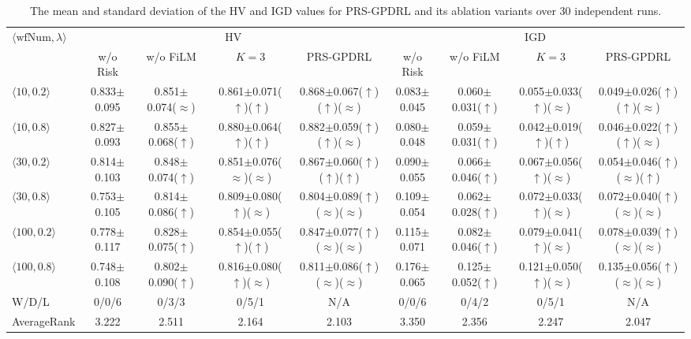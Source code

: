 \documentclass[10pt,journal]{IEEEtran}
\begin{document}
\begin{table}[!t]
\caption{The mean and standard deviation of the HV and IGD values for PRS-GPDRL
and its ablation variants over 30 independent runs.}
\label{Table: combined ablation results}
\centering
\setlength{\tabcolsep}{1.25pt}
\resizebox{\textwidth}{!}%
{\begin{tabular}{@{}lcccccccc@{}}
\toprule
\multirow{2}{*}{$\langle\mathrm{wfNum},\lambda\rangle$}
& \multicolumn{4}{c}{HV} & \multicolumn{4}{c}{IGD} \\
\cmidrule(lr){2-5}\cmidrule(lr){6-9}
& w/o Risk & w/o FiLM & $K=3$ & PRS-GPDRL
& w/o Risk & w/o FiLM & $K=3$ & PRS-GPDRL \\
\midrule
$\langle10,0.2\rangle$
& 0.833$\pm$0.095 & 0.851$\pm$0.074($\approx$) & 0.861$\pm$0.071($\uparrow$)($\uparrow$) & 0.868$\pm$0.067($\uparrow$)($\uparrow$)($\approx$)
& 0.083$\pm$0.045 & 0.060$\pm$0.031($\uparrow$) & 0.055$\pm$0.033($\uparrow$)($\approx$) & 0.049$\pm$0.026($\uparrow$)($\uparrow$)($\approx$) \\
$\langle10,0.8\rangle$
& 0.827$\pm$0.093 & 0.855$\pm$0.068($\uparrow$) & 0.880$\pm$0.064($\uparrow$)($\uparrow$) & 0.882$\pm$0.059($\uparrow$)($\uparrow$)($\approx$)
& 0.080$\pm$0.048 & 0.059$\pm$0.031($\uparrow$) & 0.042$\pm$0.019($\uparrow$)($\uparrow$) & 0.046$\pm$0.022($\uparrow$)($\uparrow$)($\approx$) \\
$\langle30,0.2\rangle$
& 0.814$\pm$0.103 & 0.848$\pm$0.074($\uparrow$) & 0.851$\pm$0.076($\approx$)($\approx$) & 0.867$\pm$0.060($\uparrow$)($\uparrow$)($\uparrow$)
& 0.090$\pm$0.055 & 0.066$\pm$0.046($\uparrow$) & 0.067$\pm$0.056($\uparrow$)($\approx$) & 0.054$\pm$0.046($\uparrow$)($\approx$)($\uparrow$) \\
$\langle30,0.8\rangle$
& 0.753$\pm$0.105 & 0.814$\pm$0.086($\uparrow$) & 0.809$\pm$0.080($\uparrow$)($\approx$) & 0.804$\pm$0.089($\uparrow$)($\approx$)($\approx$)
& 0.109$\pm$0.054 & 0.062$\pm$0.028($\uparrow$) & 0.072$\pm$0.033($\uparrow$)($\approx$) & 0.072$\pm$0.040($\uparrow$)($\approx$)($\approx$) \\
$\langle100,0.2\rangle$
& 0.778$\pm$0.117 & 0.828$\pm$0.075($\uparrow$) & 0.854$\pm$0.055($\uparrow$)($\uparrow$) & 0.847$\pm$0.077($\uparrow$)($\approx$)($\approx$)
& 0.115$\pm$0.071 & 0.082$\pm$0.046($\uparrow$) & 0.079$\pm$0.041($\uparrow$)($\approx$) & 0.078$\pm$0.039($\uparrow$)($\approx$)($\approx$) \\
$\langle100,0.8\rangle$
& 0.748$\pm$0.108 & 0.802$\pm$0.090($\uparrow$) & 0.816$\pm$0.080($\uparrow$)($\approx$) & 0.811$\pm$0.086($\uparrow$)($\approx$)($\approx$)
& 0.176$\pm$0.065 & 0.125$\pm$0.052($\uparrow$) & 0.121$\pm$0.050($\uparrow$)($\approx$) & 0.135$\pm$0.056($\uparrow$)($\approx$)($\approx$) \\
\midrule
W/D/L & 0/0/6 & 0/3/3 & 0/5/1 & N/A
      & 0/0/6 & 0/4/2 & 0/5/1 & N/A \\
AverageRank & 3.222 & 2.511 & 2.164 & 2.103
            & 3.350 & 2.356 & 2.247 & 2.047 \\
\bottomrule
\end{tabular}}
\end{table}
\end{document}
